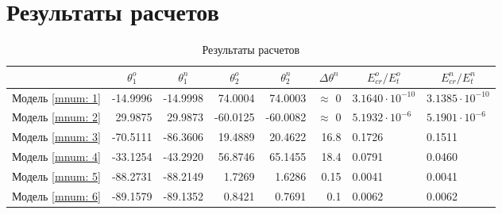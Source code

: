 \section{Результаты расчетов}

\begin{table}
\footnotesize
\centering
\caption{Результаты расчетов}
\renewcommand{\arraystretch}{1.5}
\begin{tabularx}{\textwidth}{C|rr|rr|r|ll}
				& &  &  &  & &  &  \\ \hline
\hline Модель \ref{mnum: 1} & -14.9996 & -14.9998 & 74.0004 & 74.0003 & $\approx$ 0   & $3.1640 \cdot 10^{-10}$ & $3.1385 \cdot 10^{-10}$ \\ 
	   Модель \ref{mnum: 2} & 29.9875  & 29.9873  & -60.0125& -60.0082& $\approx$ 0   & $5.1932 \cdot 10^{-6}$  & $5.1901 \cdot 10^{-6}$ \\ 
 	   Модель \ref{mnum: 3} & -70.5111 & -86.3606 & 19.4889 & 20.4622 & 16.8 & 0.1726 & 0.1511 \\ 
 	   Модель \ref{mnum: 4} & -33.1254 & -43.2920 & 56.8746 & 65.1455 & 18.4 & 0.0791 & 0.0460 \\ 
 	   Модель \ref{mnum: 5} & -88.2731 & -88.2149 & 1.7269  & 1.6286  & 0.15 & 0.0041 & 0.0041 \\
 	   Модель \ref{mnum: 6} & -89.1579 & -89.1352 & 0.8421  & 0.7691  & 0.1  & 0.0062 & 0.0062 \\
 	   \hline
\end{tabularx} 
\renewcommand{\arraystretch}{1.0}
\end{table}

